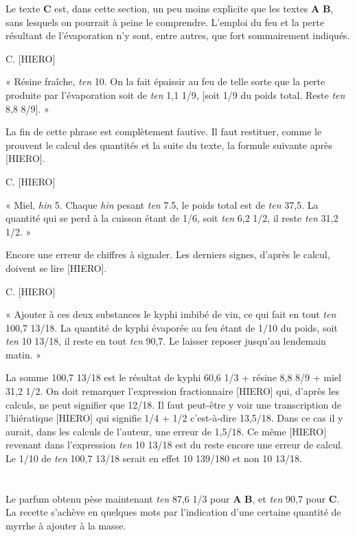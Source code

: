 \documentclass[a4paper, 11pt, oneside]{article}
\begin{document}
Le texte \textbf{C} est, dans cette section, un peu moins explicite que les textes \textbf{A} \textbf{B}, sans lesquels on pourrait à peine le comprendre. L'emploi du feu et la perte résultant de l'évaporation n'y sont, entre autres, que fort sommairement indiqués.

C. [HIERO]

« Résine fraîche, \emph{ten} 10. On la fait épaissir au feu de telle sorte que la perte produite par l'évaporation soit de \emph{ten} 1,1 1/9, [soit 1/9 du poids total. Reste \emph{ten} 8,8 8/9]. »

La fin de cette phrase est complètement fautive. Il faut restituer, comme le prouvent le calcul des quantités et la suite du texte, la formule suivante après [HIERO].

C. [HIERO]

« Miel, \emph{hin} 5. Chaque \emph{hin} pesant \emph{ten} 7.5, le poids total est de \emph{ten} 37,5. La quantité qui se perd à la cuisson étant de 1/6, soit \emph{ten} 6,2 1/2, il reste \emph{ten} 31,2 1/2. »

Encore une erreur de chiffres à signaler. Les derniers signes, d'après le calcul, doivent se lire [HIERO]. 

C. [HIERO]

« Ajouter à ces deux substances le kyphi imbibé de vin, ce qui fait en tout \emph{ten} 100,7 13/18. La quantité de kyphi évaporée au feu étant de 1/10 du poids, soit \emph{ten} 10 13/18, il reste en tout \emph{ten} 90,7. Le laisser reposer jusqu'au lendemain matin. »

La somme 100,7 13/18 est le résultat de kyphi 60,6 1/3 + résine 8,8 8/9 + miel 31,2 1/2. On doit remarquer l'expression fractionnaire [HIERO] qui, d'après les calculs, ne peut signifier que 12/18. Il faut peut-être y voir une transcription de l'hiératique [HIERO] qui signifie 1/4 + 1/2 c'est-à-dire 13,5/18. Dans ce cas il y aurait, dans les calculs de l'auteur, une erreur de 1,5/18. Ce même [HIERO] revenant dans l'expression \emph{ten} 10 13/18 est du reste encore une erreur de calcul. Le 1/10 de \emph{ten} 100,7 13/18 serait en effet 10 139/180 et non 10 13/18.
\clearpage
\section{}
\paragraph{}
Le parfum obtenu pèse maintenant \emph{ten} 87,6 1/3 pour \textbf{A} \textbf{B}, et \emph{ten} 90,7 pour \textbf{C}. La recette s'achève en quelques mots par l'indication d'une certaine quantité de myrrhe à ajouter à la masse.
\end{document}
